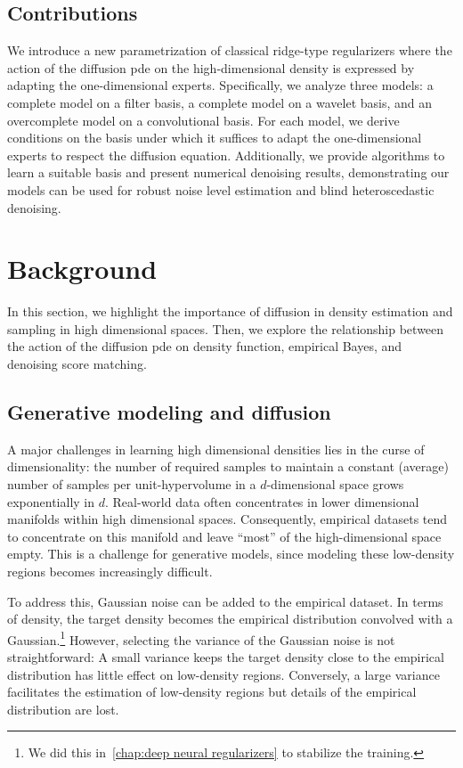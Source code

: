 \subsection{Contributions}
We introduce a new parametrization of classical ridge-type regularizers where the action of the diffusion \gls{pde} on the high-dimensional density is expressed by adapting the one-dimensional experts.
Specifically, we analyze three models:
a complete model on a filter basis, a complete model on a wavelet basis, and an overcomplete model on a convolutional basis.
For each model, we derive conditions on the basis under which it suffices to adapt the one-dimensional experts to respect the diffusion equation.
Additionally, we provide algorithms to learn a suitable basis and present numerical denoising results, demonstrating our models can be used for robust noise level estimation and blind heteroscedastic denoising.
\section{Background}%
\label{sec:background}
In this section, we highlight the importance of diffusion in density estimation and sampling in high dimensional spaces.
Then, we explore the relationship between the action of the diffusion \gls{pde} on density function, empirical Bayes, and denoising score matching.
\subsection{Generative modeling and diffusion}
A major challenges in learning high dimensional densities lies in the curse of dimensionality:
the number of required samples to maintain a constant (average) number of samples per unit-hypervolume in a \( d \)-dimensional space grows exponentially in \( d \).
Real-world data often concentrates in lower dimensional manifolds within high dimensional spaces.
Consequently, empirical datasets tend to concentrate on this manifold and leave \enquote{most} of the high-dimensional space empty.
This is a challenge for generative models, since modeling these low-density regions becomes increasingly difficult.

To address this, Gaussian noise can be added to the empirical dataset.
In terms of density, the target density becomes the empirical distribution convolved with a Gaussian.\footnote{
	We did this in~\cref{chap:deep neural regularizers} to stabilize the training.
}
However, selecting the variance of the Gaussian noise is not straightforward:
A small variance keeps the target density close to the empirical distribution has little effect on low-density regions.
Conversely, a large variance facilitates the estimation of low-density regions but details of the empirical distribution are lost.

